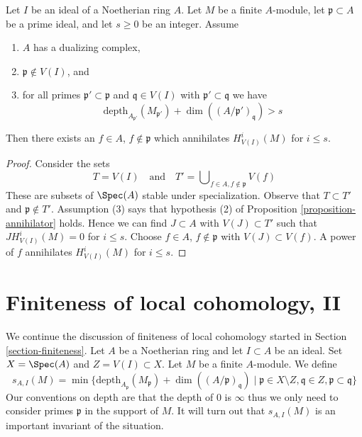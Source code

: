\begin{lemma}
\label{lemma-kill-local-cohomology-at-prime}
Let $I$ be an ideal of a Noetherian ring $A$.
Let $M$ be a finite $A$-module, let $\mathfrak p \subset A$ be a prime
ideal, and let $s \geq 0$ be an integer. Assume
\begin{enumerate}
\item $A$ has a dualizing complex,
\item $\mathfrak p \not \in V(I)$, and
\item for all primes $\mathfrak p' \subset \mathfrak p$
and $\mathfrak q \in V(I)$ with $\mathfrak p' \subset \mathfrak q$ we have
$$
\text{depth}_{A_{\mathfrak p'}}(M_{\mathfrak p'}) +
\dim((A/\mathfrak p')_\mathfrak q) > s
$$
\end{enumerate}
Then there exists an $f \in A$, $f \not \in \mathfrak p$ which annihilates
$H^i_{V(I)}(M)$ for $i \leq s$.
\end{lemma}

\begin{proof}
Consider the sets
$$
T = V(I)
\quad\text{and}\quad
T' = \bigcup\nolimits_{f \in A, f \not \in \mathfrak p} V(f)
$$
These are subsets of $\Spec(A)$ stable under specialization.
Observe that $T \subset T'$ and $\mathfrak p \not \in T'$.
Assumption (3) says that hypothesis (2) of
Proposition \ref{proposition-annihilator} holds.
Hence we can find $J \subset A$ with $V(J) \subset T'$
such that $J H^i_{V(I)}(M) = 0$ for $i \leq s$.
Choose $f \in A$, $f \not \in \mathfrak p$ with $V(J) \subset V(f)$.
A power of $f$ annihilates $H^i_{V(I)}(M)$ for $i \leq s$.
\end{proof}





\section{Finiteness of local cohomology, II}
\label{section-finiteness-II}

\noindent
We continue the discussion of finiteness of local cohomology
started in Section \ref{section-finiteness}.
Let $A$ be a Noetherian ring and let $I \subset A$ be an ideal.
Set $X = \Spec(A)$ and $Z = V(I) \subset X$. Let $M$ be a finite $A$-module.
We define
\begin{equation}
\label{equation-cutoff}
s_{A, I}(M) =
\min \{
\text{depth}_{A_\mathfrak p}(M_\mathfrak p) + \dim((A/\mathfrak p)_\mathfrak q)
\mid
\mathfrak p \in X \setminus Z, \mathfrak q \in Z,
\mathfrak p \subset \mathfrak q
\}
\end{equation}
Our conventions on depth are that the depth of $0$ is $\infty$
thus we only need to consider primes $\mathfrak p$ in the support
of $M$. It will turn out that $s_{A, I}(M)$ is an important invariant of
the situation.

